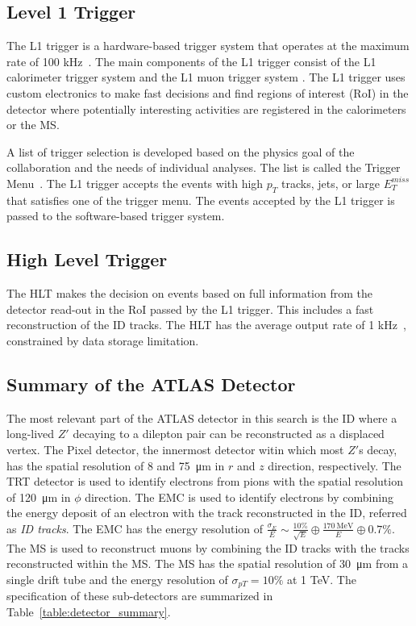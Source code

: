 \subsection{Level 1 Trigger}
\label{sec:atlas:l1trigger}

The L1 trigger is a hardware-based trigger system that operates at the maximum rate of 100 \si{\kilo\hertz}~\cite{1742-6596-762-1-012003}. The main components of the L1 trigger consist of the L1 calorimeter trigger system and the L1 muon trigger system . The L1 trigger uses custom electronics to make fast decisions and find regions of interest (RoI) in the detector where potentially interesting activities are registered in the calorimeters or the MS.

A list of trigger selection is developed based on the physics goal of the collaboration and the needs of individual analyses. The list is called the Trigger Menu~\cite{VazquezSchroeder:2287548}. The L1 trigger accepts the events with high $p_{T}$ tracks, jets, or large $E_{T}^{miss}$ that satisfies one of the trigger menu. The events accepted by the L1 trigger is passed to the software-based trigger system.


\subsection{High Level Trigger}
\label{sec:atlas:hlt}

The HLT makes the decision on events based on full information from the detector read-out in the RoI passed by the L1 trigger. This includes a fast reconstruction of the ID tracks. The HLT has the average output rate of 1 \si{\kilo\hertz}~\cite{1742-6596-762-1-012003}, constrained by data storage limitation. 


\subsection{Summary of the ATLAS Detector}
\label{sec:atlas:summary}

The most relevant part of the ATLAS detector in this search is the ID where a long-lived $Z'$ decaying to a dilepton pair can be reconstructed as a displaced vertex. The Pixel detector, the innermost detector witin which most $Z'$s decay, has the spatial resolution of 8 and 75~\si{\micro\meter} in $r$ and $z$ direction, respectively. The TRT detector is used to identify electrons from pions with the spatial resolution of 120~\si{\micro\meter} in $\phi$ direction. The EMC is used to identify electrons by combining the energy deposit of an electron with the track reconstructed in the ID, referred as \textit{ID tracks}. The EMC has the energy resolution of $\frac{\sigma_{E}}{E} \sim \frac{10\%}{\sqrt{E}}\oplus\frac{170~\mathrm{MeV}}{E}\oplus 0.7\%$. The MS is used to reconstruct muons by combining the ID tracks with the tracks reconstructed within the MS. The MS has the spatial resolution of 30~\si{\micro\meter} from a single drift tube and the energy resolution of $\sigma_{p{T}} = 10\%$ at 1 TeV. The specification of these sub-detectors are summarized in Table~\ref{table:detector_summary}.

